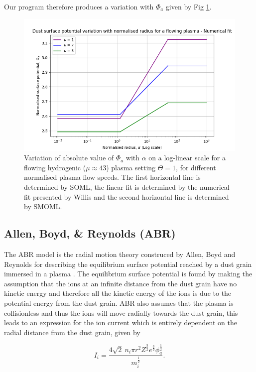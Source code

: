 \documentclass[journal]{Imperial_lab_report}
\begin{document}
\smallskip

Our program therefore produces a variation with $\Phi_a$ given by Fig \ref{FlowingNumFit}.

\begin{figure}[H]
\centering
\includegraphics[width=\linewidth]{Output/flowinggraph.jpeg}
\caption{Variation of absolute value of $\Phi_a$ with $\alpha$ on a log-linear scale for a flowing hydrogenic ($\mu \approx 43$) plasma setting $\Theta = 1$, for different normalised plasma flow speeds. The first horizontal line is determined by SOML, the linear fit is determined by the numerical fit presented by Willis \cite{Willis} and the second horizontal line is determined by SMOML.}
\label{FlowingNumFit} 
\end{figure}

\subsection{Allen, Boyd, \& Reynolds (ABR)}

The ABR model is the radial motion theory construced by Allen, Boyd and Reynolds for describing the equilibrium surface potential reached by a dust grain immersed in a plasma \cite{ABR}. The equilibrium surface potential is found by making the assumption that the ions at an infinite distance from the dust grain have no kinetic energy and therefore all the kinetic energy of the ions is due to the potential energy from the dust grain. ABR also assumes that the plasma is collisionless and thus the ions will move radially towards the dust grain, this leads to an expression for the ion current which is entirely dependent on the radial distance from the dust grain, given by

\begin{equation}\label{eq:ABRIi}
{I_i = \frac{4\sqrt{2} \ n_i \pi r^2 Z^{\frac{3}{2}}e^{\frac{3}{2}} \phi_a^{\frac{1}{2}} } {m_i^{\frac{1}{2}}}}.
\end{equation}
\end{document}
